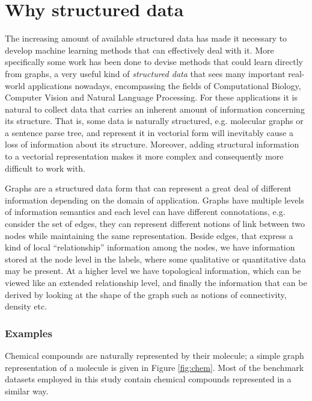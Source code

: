 \section{Why structured data}
\label{sec:why}

The increasing amount of available structured data has made it necessary to develop
machine learning methods that can effectively deal with it.
More specifically some work has been done to devise methods that could learn
directly from graphs, a very useful kind of \emph{structured data} that sees many
important real-world applications nowadays, encompassing the fields of Computational
Biology, Computer Vision and Natural Language Processing.
For these applications it is natural to collect data that carries an inherent
amount of information concerning its structure.
That is, some data is naturally structured, e.g. molecular graphs or a sentence parse tree,
and represent it in vectorial form will inevitably cause a loss of information about
its structure.
Moreover, adding structural information to a vectorial representation
makes it more complex and consequently more difficult to work with.

Graphs are a structured data form that can represent a great deal of different
information depending on the domain of application.
Graphs have multiple levels of information semantics and each level can have
different connotations, e.g. consider the set of edges, they can represent
different notions of link between two nodes while maintaining the same
representation.
Beside edges, that express a kind of local ``relationship''
information among the nodes, we have information stored at the node level in the
labels, where some qualitative or quantitative data may be present.
At a higher level we have topological information, which can be
viewed like an extended relationship level, and finally the information that can
be derived by looking at the shape of the graph such as notions
of connectivity, density etc.

\subsubsection{Examples}
\label{subsubsec:examples}

Chemical compounds are naturally represented by their molecule; a simple graph
representation of a molecule is given in Figure \ref{fig:chem}.
Most of the benchmark datasets employed in this study contain chemical compounds
represented in a similar way.

